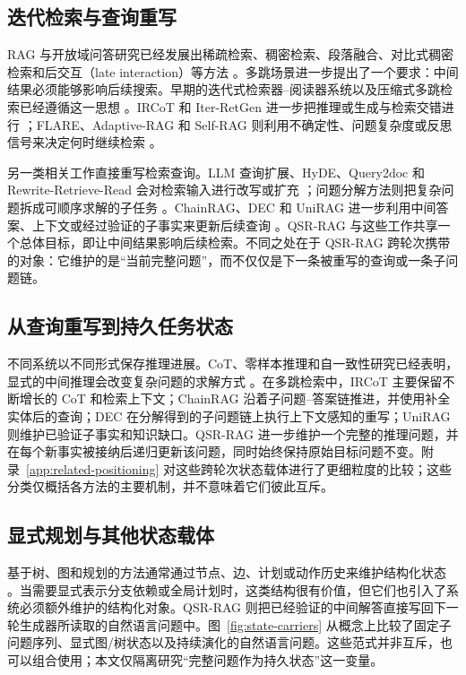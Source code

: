 \documentclass[11pt]{article}
\begin{document}
	\subsection{迭代检索与查询重写}
	RAG 与开放域问答研究已经发展出稀疏检索、稠密检索、段落融合、对比式稠密检索和后交互（late interaction）等方法 \citep{guu2020realm,lewis2020rag,karpukhin2020dpr,izacard2021fid,izacard2022contriever,khattab2020colbert,izacard2023atlas}。多跳场景进一步提出了一个要求：中间结果必须能够影响后续搜索。早期的迭代式检索器--阅读器系统以及压缩式多跳检索已经遵循这一思想 \citep{das2019multistep,khattab2021baleen,yang2018hotpotqa,ho2020twowiki,trivedi2022musique}。IRCoT 和 Iter-RetGen 进一步把推理或生成与检索交错进行 \citep{trivedi2023ircot,shao2023iterretgen}；FLARE、Adaptive-RAG 和 Self-RAG 则利用不确定性、问题复杂度或反思信号来决定何时继续检索 \citep{jiang2023flare,jeong2024adaptive,asai2024selfrag}。

	另一类相关工作直接重写检索查询。LLM 查询扩展、HyDE、Query2doc 和 Rewrite-Retrieve-Read 会对检索输入进行改写或扩充 \citep{jagerman2023queryexpansion,gao2023hyde,wang2023query2doc,ma2023rewrite}；问题分解方法则把复杂问题拆成可顺序求解的子任务 \citep{wolfson2020break,zhou2023leasttomost,khot2023decomposed}。ChainRAG、DEC 和 UniRAG 进一步利用中间答案、上下文或经过验证的子事实来更新后续查询 \citep{zhu2025chainrag,ji2025dec,kim2025unirag}。QSR-RAG 与这些工作共享一个总体目标，即让中间结果影响后续检索。不同之处在于 QSR-RAG 跨轮次携带的对象：它维护的是“当前完整问题”，而不仅仅是下一条被重写的查询或一条子问题链。

	\subsection{从查询重写到持久任务状态}
	不同系统以不同形式保存推理进展。CoT、零样本推理和自一致性研究已经表明，显式的中间推理会改变复杂问题的求解方式 \citep{wei2022cot,kojima2022zeroshot,wang2023selfconsistency}。在多跳检索中，IRCoT 主要保留不断增长的 CoT 和检索上下文；ChainRAG 沿着子问题--答案链推进，并使用补全实体后的查询；DEC 在分解得到的子问题链上执行上下文感知的重写；UniRAG 则维护已验证子事实和知识缺口。QSR-RAG 进一步维护一个完整的推理问题，并在每个新事实被接纳后递归更新该问题，同时始终保持原始目标问题不变。附录~\ref{app:related-positioning} 对这些跨轮次状态载体进行了更细粒度的比较；这些分类仅概括各方法的主要机制，并不意味着它们彼此互斥。

	\subsection{显式规划与其他状态载体}
	基于树、图和规划的方法通常通过节点、边、计划或动作历史来维护结构化状态 \citep{cao2023probtree,yao2023tot,besta2024got,yao2023react,sarthi2024raptor,huang2026structured,li2026par2rag,shi2026trees}。当需要显式表示分支依赖或全局计划时，这类结构很有价值，但它们也引入了系统必须额外维护的结构化对象。QSR-RAG 则把已经验证的中间解答直接写回下一轮生成器所读取的自然语言问题中。图~\ref{fig:state-carriers} 从概念上比较了固定子问题序列、显式图/树状态以及持续演化的自然语言问题。这些范式并非互斥，也可以组合使用；本文仅隔离研究“完整问题作为持久状态”这一变量。
\end{document}
